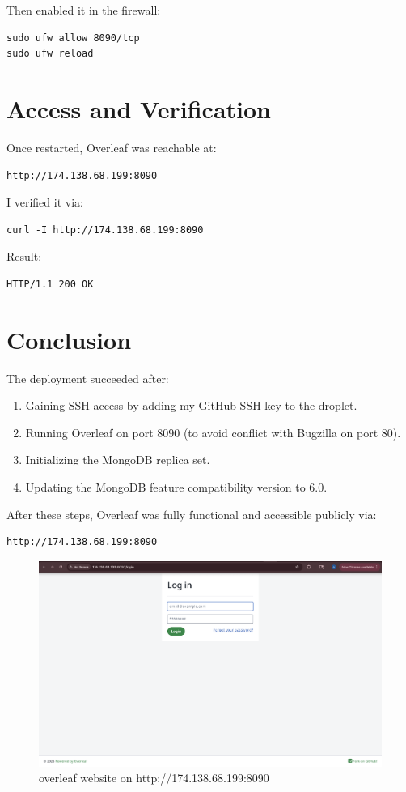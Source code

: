 Then enabled it in the firewall:
\begin{verbatim}
sudo ufw allow 8090/tcp
sudo ufw reload
\end{verbatim}

\section{Access and Verification}
Once restarted, Overleaf was reachable at:
\begin{verbatim}
http://174.138.68.199:8090
\end{verbatim}

I verified it via:
\begin{verbatim}
curl -I http://174.138.68.199:8090
\end{verbatim}

Result:
\begin{verbatim}
HTTP/1.1 200 OK
\end{verbatim}

\section{Conclusion}
The deployment succeeded after:
\begin{enumerate}
  \item Gaining SSH access by adding my GitHub SSH key to the droplet.
  \item Running Overleaf on port 8090 (to avoid conflict with Bugzilla on port 80).
  \item Initializing the MongoDB replica set.
  \item Updating the MongoDB feature compatibility version to 6.0.
\end{enumerate}

After these steps, Overleaf was fully functional and accessible publicly via:
\begin{verbatim}
http://174.138.68.199:8090
\end{verbatim}

\begin{figure}
    \centering
    \includegraphics[width=1.0\linewidth]{png/overleaf running.png}
    \caption{overleaf website on http://174.138.68.199:8090}
    \label{fig:placeholder}
\end{figure}

